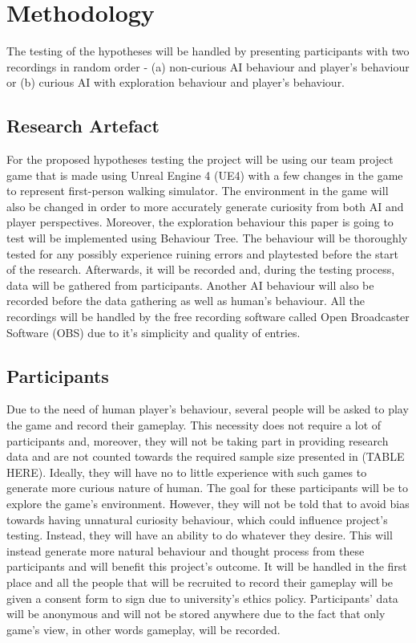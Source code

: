 \documentclass[journal]{IEEEtran}
\begin{document}
\section{Methodology}
The testing of the hypotheses will be handled by presenting participants with two recordings in random order - (a) non-curious AI behaviour and player's behaviour or (b) curious AI with exploration behaviour and player's behaviour.

\subsection{Research Artefact}
For the proposed hypotheses testing the project will be using our team project game that is made using Unreal Engine 4 (UE4) with a few changes in the game to represent first-person walking simulator. The environment in the game will also be changed in order to more accurately generate curiosity from both AI and player perspectives. Moreover, the exploration behaviour this paper is going to test will be implemented using Behaviour Tree. The behaviour will be thoroughly tested for any possibly experience ruining errors and playtested before the start of the research. Afterwards, it will be recorded and, during the testing process, data will be gathered from participants. Another AI behaviour will also be recorded before the data gathering as well as human's behaviour. All the recordings will be handled by the free recording software called Open Broadcaster Software (OBS) due to it's simplicity and quality of entries.

\subsection{Participants}
Due to the need of human player's behaviour, several people will be asked to play the game and record their gameplay. This necessity does not require a lot of participants and, moreover, they will not be taking part in providing research data and are not counted towards the required sample size presented in (TABLE HERE). Ideally, they will have no to little experience with such games to generate more curious nature of human. The goal for these participants will be to explore the game's environment. However, they will not be told that to avoid bias towards having unnatural curiosity behaviour, which could influence project's testing. Instead, they will have an ability to do whatever they desire. This will instead generate more natural behaviour and thought process from these participants and will benefit this project's outcome. It will be handled in the first place and all the people that will be recruited to record their gameplay will be given a consent form to sign due to university's ethics policy. Participants' data will be anonymous and will not be stored anywhere due to the fact that only game's view, in other words gameplay, will be recorded.
\end{document}
